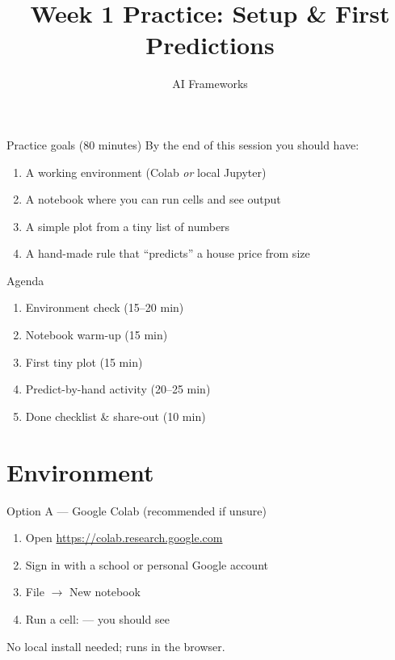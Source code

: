 \documentclass[aspectratio=169,11pt]{beamer}
\title{Week 1 Practice: Setup \& First Predictions}
\subtitle{AI Frameworks}
\begin{document}
    \begin{frame}
        \titlepage
    \end{frame}

    \begin{frame}{Practice goals (80 minutes)}
        By the end of this session you should have:
        \begin{enumerate}
            \item A working environment (Colab \emph{or} local Jupyter)
            \item A notebook where you can run cells and see output
            \item A simple plot from a tiny list of numbers
            \item A hand-made rule that ``predicts'' a house price from size
        \end{enumerate}
    \end{frame}

    \begin{frame}{Agenda}
        \begin{enumerate}
            \item Environment check (15--20 min)
            \item Notebook warm-up (15 min)
            \item First tiny plot (15 min)
            \item Predict-by-hand activity (20--25 min)
            \item Done checklist \& share-out (10 min)
        \end{enumerate}
    \end{frame}

    \section{Environment}

    \begin{frame}{Option A --- Google Colab (recommended if unsure)}
        \begin{enumerate}
            \item Open \url{https://colab.research.google.com}
            \item Sign in with a school or personal Google account
            \item File $\rightarrow$ New notebook
            \item Run a cell:  --- you should see 
        \end{enumerate}
        \vspace{0.5em}
        No local install needed; runs in the browser.
    \end{frame}
\end{document}
